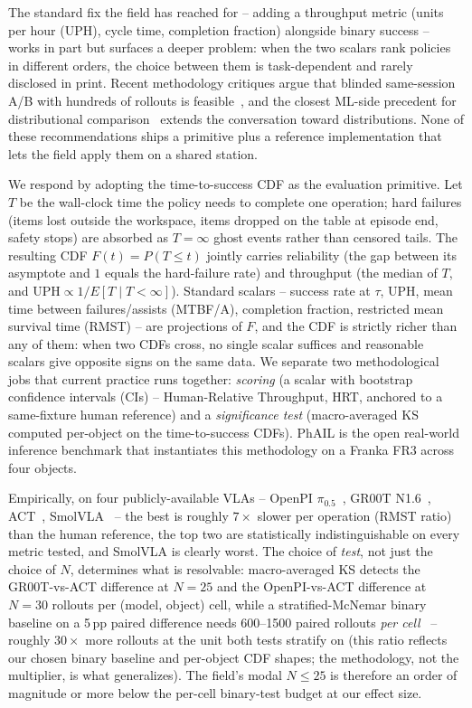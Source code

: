 \documentclass{article}
\begin{document}
The standard fix the field has reached for -- adding a throughput metric (units per hour (UPH), cycle time, completion fraction) alongside binary success -- works in part but surfaces a deeper problem: when the two scalars rank policies in different orders, the choice between them is task-dependent and rarely disclosed in print. Recent methodology critiques argue that blinded same-session A/B with hundreds of rollouts is feasible~\cite{kress2024,lbm2026}, and the closest ML-side precedent for distributional comparison~\cite{agarwal2021} extends the conversation toward distributions. None of these recommendations ships a primitive plus a reference implementation that lets the field apply them on a shared station.

We respond by adopting the time-to-success CDF as the evaluation primitive. Let $T$ be the wall-clock time the policy needs to complete one operation; hard failures (items lost outside the workspace, items dropped on the table at episode end, safety stops) are absorbed as $T = \infty$ ghost events rather than censored tails. The resulting CDF $F(t) = P(T \le t)$ jointly carries reliability (the gap between its asymptote and $1$ equals the hard-failure rate) and throughput (the median of $T$, and $\text{UPH} \propto 1/E[T \mid T < \infty]$). Standard scalars -- success rate at $\tau$, UPH, mean time between failures/assists (MTBF/A), completion fraction, restricted mean survival time (RMST) -- are projections of $F$, and the CDF is strictly richer than any of them: when two CDFs cross, no single scalar suffices and reasonable scalars give opposite signs on the same data. We separate two methodological jobs that current practice runs together: \emph{scoring} (a scalar with bootstrap confidence intervals (CIs) -- Human-Relative Throughput, HRT, anchored to a same-fixture human reference) and a \emph{significance test} (macro-averaged KS computed per-object on the time-to-success CDFs). PhAIL is the open real-world inference benchmark that instantiates this methodology on a Franka FR3 across four objects.

Empirically, on four publicly-available VLAs -- OpenPI $\pi_{0.5}$~\cite{pi05}, GR00T N1.6~\cite{groot_n1}, ACT~\cite{act}, SmolVLA~\cite{smolvla} -- the best is roughly $7\times$ slower per operation (RMST ratio) than the human reference, the top two are statistically indistinguishable on every metric tested, and SmolVLA is clearly worst. The choice of \emph{test}, not just the choice of $N$, determines what is resolvable: macro-averaged KS detects the GR00T-vs-ACT difference at $N{=}25$ and the OpenPI-vs-ACT difference at $N{=}30$ rollouts per (model, object) cell, while a stratified-McNemar binary baseline on a 5\,pp paired difference needs 600--1500 paired rollouts \emph{per cell}~\cite{mcnemar1947,connor1987} -- roughly $30\times$ more rollouts at the unit both tests stratify on (this ratio reflects our chosen binary baseline and per-object CDF shapes; the methodology, not the multiplier, is what generalizes). The field's modal $N \le 25$ is therefore an order of magnitude or more below the per-cell binary-test budget at our effect size.
\end{document}
